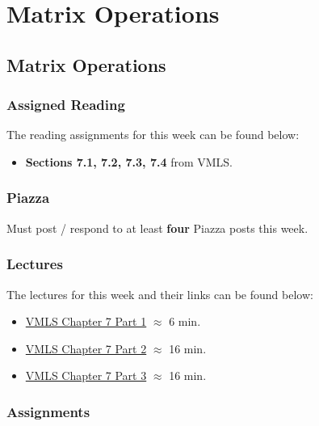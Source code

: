 \clearpage

\renewcommand{\ChapTitle}{Matrix Operations}
\renewcommand{\SectionTitle}{Matrix Operations}

\chapter{\ChapTitle}
\section{\SectionTitle}

\subsection{Assigned Reading}

The reading assignments for this week can be found below:

\begin{itemize}
    \item \textbf{Sections 7.1, 7.2, 7.3, 7.4} from VMLS.
\end{itemize}

\subsection{Piazza}

Must post / respond to at least \textbf{four} Piazza posts this week.  

\subsection{Lectures}

The lectures for this week and their links can be found below:

\begin{itemize}
    \item \href{https://www.youtube.com/watch?v=jXN50fuRSqE}{VMLS Chapter 7 Part 1} $\approx$ 6 min.
    \item \href{https://www.youtube.com/watch?v=v7CH2ry-vrQ}{VMLS Chapter 7 Part 2} $\approx$ 16 min.
    \item \href{https://www.youtube.com/watch?v=kTg0vKppOl8}{VMLS Chapter 7 Part 3} $\approx$ 16 min.
\end{itemize}

\subsection{Assignments}

